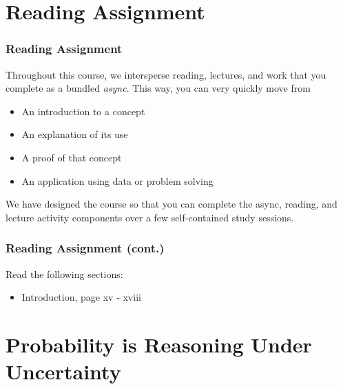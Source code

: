 \documentclass[12pt, block=fill]{beamer}
\begin{document}
\section{Reading Assignment}

\begin{frame}
  \frametitle{Reading Assignment}
  Throughout this course, we intersperse reading, lectures, and work
  that you complete as a bundled \textit{async}. This way, you can
  very quickly move from 
  \begin{itemize}
  \item An introduction to a concept
  \item An explanation of its use
  \item A proof of that concept 
  \item An application using data or problem solving
  \end{itemize}
  We have designed the course so that you can complete the async,
  reading, and lecture activity components over a few self-contained
  study sessions.
\end{frame}

\begin{frame}
  \frametitle{Reading Assignment (cont.)}
  Read the following sections:

  \begin{itemize}
  \item Introduction, page xv - xviii
  \end{itemize}
\end{frame}

\section{Probability is Reasoning Under Uncertainty}
\end{document}
